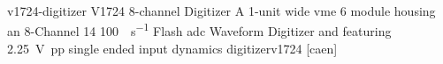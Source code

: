 \newglsXequipment%
{v1724-digitizer}%
{V1724 8{\--}channel Digitizer}%
{A 1-unit wide \gls{vme} \SI{6}{\rackunit} module housing an 8{\--}Channel \SI{14}{\bit} \SI{100}{\per\second} Flash \gls{adc} Waveform Digitizer and featuring \SI{2.25}{\volt{pp}} single ended input dynamics}%
{digitizerv1724}%
[caen]%